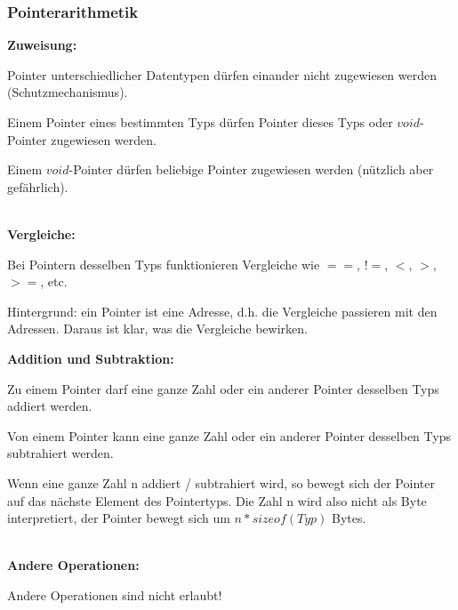 	\subsubsection{Pointerarithmetik }
		\begin{minipage}[t]{9 cm}
			\textbf{Zuweisung:} 
			\begin{compactitem}
				\item Pointer unterschiedlicher Datentypen dürfen einander nicht zugewiesen werden (Schutzmechanismus).
				\item Einem Pointer eines bestimmten Typs dürfen Pointer dieses Typs oder $void$-Pointer zugewiesen werden.
				\item Einem $void$-Pointer dürfen beliebige Pointer zugewiesen werden (nützlich aber gefährlich).
			\end{compactitem}
			\ \\
			\textbf{Vergleiche:} 
			\begin{compactitem}
				\item Bei Pointern desselben Typs funktionieren Vergleiche wie $==$, $!=$, $<$, $>$, $>=$, etc.
				\item Hintergrund: ein Pointer ist eine Adresse, d.h. die Vergleiche passieren mit den Adressen. Daraus ist klar, was die Vergleiche bewirken.
			\end{compactitem}
		\end{minipage}	
		\hspace*{0.5cm}
		\begin{minipage}[t]{9 cm}
			\textbf{Addition und Subtraktion:} 
				\begin{compactitem}
					\item Zu einem Pointer darf eine ganze Zahl oder ein anderer Pointer desselben Typs addiert werden.
					\item Von einem Pointer kann eine ganze Zahl oder ein anderer Pointer desselben	Typs subtrahiert werden.
					\item Wenn eine ganze Zahl n addiert / subtrahiert wird, so bewegt sich der Pointer	auf das nächste Element des Pointertyps. Die Zahl n wird also nicht als Byte interpretiert, der Pointer bewegt sich um $n*sizeof(Typ)$ Bytes.
				\end{compactitem}
				\ \\
				\textbf{Andere Operationen:} 
				\begin{compactitem}
					\item Andere Operationen sind nicht erlaubt!
				\end{compactitem}
		\end{minipage}	

